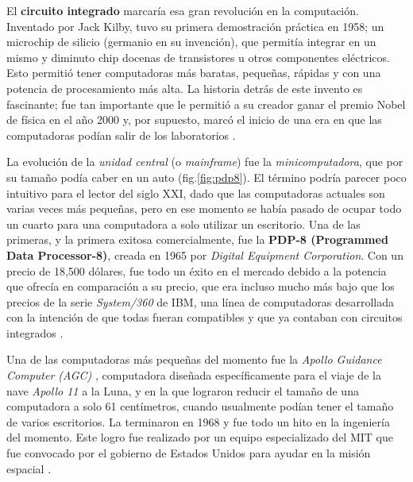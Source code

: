\documentclass[letterpaper,12pt,oneside]{book}
\begin{document}
        El \textbf{circuito integrado} marcaría esa gran revolución en la computación. Inventado por
		Jack Kilby, tuvo su primera demostración práctica en 1958; un microchip de silicio (germanio en su invención), que permitía integrar
		en un mismo y diminuto chip docenas de transistores u otros componentes eléctricos. Esto permitió tener computadoras más baratas, pequeñas, rápidas y con una potencia 
		de procesamiento más
		alta. La historia detrás de este invento es fascinante; fue tan importante que le permitió a su creador ganar el premio
		Nobel de física en el año 2000 y, por supuesto, marcó el inicio de una era en que las computadoras podían salir de los laboratorios \cite{null_essentials_2003}.
		
		
		La evolución de la \textit{unidad central} (o \textit{mainframe}) fue la \textit{minicomputadora}, que por su tamaño podía caber en un auto (fig.\ref{fig:pdp8}).
		El término podría parecer poco intuitivo para el lector del siglo XXI, dado que las computadoras actuales son varias veces más pequeñas, pero
		en ese momento se había pasado de ocupar todo un cuarto para una computadora a solo utilizar un escritorio. Una de las primeras, y la primera
		exitosa comercialmente, fue la \textbf{PDP-8 (Programmed Data Processor-8)}, creada en 1965 por \textit{Digital Equipment Corporation}. 
        Con un precio
		de 18,500 dólares, fue todo un éxito en el mercado debido a la potencia que ofrecía en comparación a su precio, que era incluso mucho más bajo que los precios de la serie
		\textit{System/360} de IBM, una línea de computadoras desarrollada con la intención de que todas fueran compatibles y que ya contaban con circuitos
		integrados \cite{null_essentials_2003}.
  
		
		Una de las computadoras más pequeñas del momento fue la \textit{Apollo Guidance Computer (AGC) }, computadora diseñada específicamente para el viaje
		de la nave \textit{Apollo 11}  a la Luna, y en la que lograron reducir el tamaño de una computadora a solo 61 centímetros, cuando
		usualmente podían tener el tamaño de  varios escritorios.
 		La terminaron en 1968 y fue todo un hito en la ingeniería del momento. Este logro fue realizado por un equipo especializado del MIT que fue convocado
 		por el gobierno de Estados Unidos para ayudar en la misión espacial \cite{computer_history_museum_computers_nodate}.
		
\end{document}
